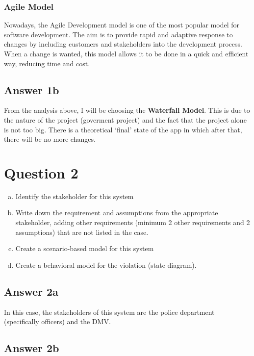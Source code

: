 \documentclass[
  11pt, %
]{assignment}
\begin{document}
\subsubsection*{Agile Model}

Nowadays, the Agile Development model is one of the most popular model for software development. The aim is to provide rapid and adaptive response to changes by including customers and stakeholders into the development process. When a change is wanted, this model allows it to be done in a quick and efficient way, reducing time and cost.

\subsection*{Answer 1b}

From the analysis above, I will be choosing the \textbf{Waterfall Model}. This is due to the nature of the project (goverment project) and the fact that the project alone is not too big. There is a theoretical `final' state of the app in which after that, there will be no more changes.

\section*{Question 2}
\begin{problem}
\begin{enumerate}[a.]
  \item Identify the stakeholder for this system
  \item Write down the requirement and assumptions from the appropriate stakeholder, adding other requirements (minimum 2 other requirements and 2 assumptions) that are not listed in the case.
  \item Create a scenario-based model for this system
  \item Create a behavioral model for the violation (state diagram).
\end{enumerate}
\end{problem}

\subsection*{Answer 2a}

In this case, the stakeholders of this system are the police department (specifically officers) and the DMV.

\subsection*{Answer 2b}
\end{document}
